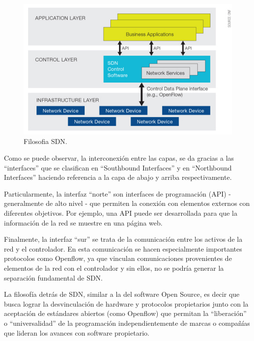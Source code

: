 \documentclass[12pt,a4paper,oneside]{book}
\begin{document}
\begin{figure}[ht]
 \centering
 \includegraphics[scale=0.6]{fotos/2_MarcoTeorico/sdn_filosofia.png}
 \caption{Filosofia SDN.}
 \label{filosofiasdn}
\end{figure}

Como se puede observar, la interconexión entre las capas, se da gracias a las “interfaces” que se clasifican en “Southbound Interfaces” y en “Northbound Interfaces” haciendo referencia a la capa de abajo y arriba respectivamente.

\vspace{0.5cm}

Particularmente, la interfaz “norte” son interfaces de programación (API) - generalmente de alto nivel - que permiten la conexión con elementos externos con diferentes objetivos. Por ejemplo, una API puede ser desarrollada para que la información de la red se muestre en una página web.

\vspace{0.5cm}

Finalmente, la interfaz “sur” se trata de la comunicación entre los activos de la red y el controlador. En esta comunicación se hacen especialmente importantes protocolos como Openflow, ya que vinculan comunicaciones provenientes de elementos de la red con el controlador y sin ellos, no se podría generar la separación fundamental de SDN.

\vspace{0.5cm}

La filosofía detrás de SDN, similar a la del software Open Source, es decir que busca lograr la desvinculación de hardware y protocolos propietarios junto con la aceptación de estándares abiertos (como Openflow) que permitan la “liberación” o “universalidad” de la programación independientemente de marcas o compañías que lideran los avances con software propietario. 
\end{document}
